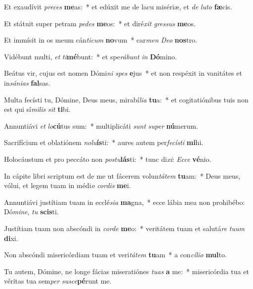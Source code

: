 \item Et exaudívit \textit{pre}\textit{ces} \textbf{me}as:~* et edúxit me de lacu misériæ, et \textit{de} \textit{lu}\textit{to} \textbf{fæ}cis.
\item Et státuit super petram \textit{pe}\textit{des} \textbf{me}os:~* et diré\textit{xit} \textit{gres}\textit{sus} \textbf{me}os.
\item Et immísit in os meum cán\textit{ti}\textit{cum} \textbf{no}vum~* car\textit{men} \textit{De}\textit{o} \textbf{nos}tro.
\item Vidébunt multi, \textit{et} \textit{ti}\textbf{mé}bunt:~* et spe\textit{rá}\textit{bunt} \textit{in} \textbf{Dó}mino.
\item Beátus vir, cujus est nomen Dómi\textit{ni} \textit{spes} \textbf{e}jus~* et non respéxit in vanitátes et in\textit{sá}\textit{ni}\textit{as} \textbf{fal}sas.
\item Multa fecísti tu, Dómine, Deus meus, mirabí\textit{li}\textit{a} \textbf{tu}a:~* et cogitatiónibus tuis non est qui sí\textit{mi}\textit{lis} \textit{sit} \textbf{ti}bi.
\item Annuntiávi \textit{et} \textit{lo}\textbf{cú}tus sum:~* multiplicáti \textit{sunt} \textit{su}\textit{per} \textbf{nú}merum.
\item Sacrifícium et oblatiónem \textit{no}\textit{lu}\textbf{ís}ti:~* aures autem per\textit{fe}\textit{cís}\textit{ti} \textbf{mi}hi.
\item Holocáustum et pro peccáto non \textit{pos}\textit{tu}\textbf{lás}ti:~* tunc di\textit{xi}: \textit{Ec}\textit{ce} \textbf{vé}nio.
\item In cápite libri scriptum est de me ut fácerem volun\textit{tá}\textit{tem} \textbf{tu}am:~* Deus meus, vólui, et legem tuam in médi\textit{o} \textit{cor}\textit{dis} \textbf{me}i.
\item Annuntiávi justítiam tuam in ecclé\textit{si}\textit{a} \textbf{ma}gna,~* ecce lábia mea non prohibébo: Dó\textit{mi}\textit{ne}, \textit{tu} \textbf{scis}ti.
\item Justítiam tuam non abscóndi in \textit{cor}\textit{de} \textbf{me}o:~* veritátem tuam et salutá\textit{re} \textit{tu}\textit{um} \textbf{di}xi.
\item Non abscóndi misericórdiam tuam et veri\textit{tá}\textit{tem} \textbf{tu}am~* a con\textit{cí}\textit{li}\textit{o} \textbf{mul}to.
\item Tu autem, Dómine, ne longe fácias miseratiónes \textit{tu}\textit{as} \textbf{a} me:~* misericórdia tua et véritas tua sem\textit{per} \textit{su}\textit{sce}\textbf{pé}runt me.
